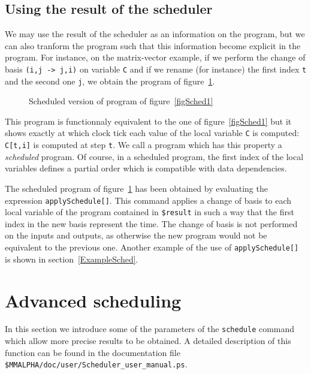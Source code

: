 \subsection{Using the result of the scheduler}

We may use the result of the scheduler as an information on the program, 
but we can also tranform the {\aalpha} program such that this information
become explicit in the program.  For instance, on the matrix-vector example, 
if we perform the change of basis
\texttt{(i,j -> j,i)} on variable \texttt{C}
and if we rename (for instance) 
the first index \texttt{t} and the second one \texttt{j},
we obtain the program of figure~\ref{figSched3}.

\begin{figure}[htbp]

\caption{Scheduled version of  program of figure~\ref{figSched1}}
\label{figSched3}
\end{figure}

This program is functionnaly equivalent to the one of figure~\ref{figSched1}
but it shows exactly at which clock tick each  value of the local variable
\texttt{C} is computed: \texttt{C[t,i]} is computed at step \texttt{t}. We call
a program which has this property a  {\em
scheduled} {\aalpha} program.  Of course, in a scheduled {\aalpha}
program, the first index of the local variables defines a partial
order which is compatible with data dependencies.

The scheduled program of figure~\ref{figSched3} has been obtained by
evaluating the expression
\texttt{applySchedule[]}.  This command applies a
change of basis to each local variable of the program contained in
\texttt{\$result} in such a way that the first index in the new basis
represent the time. The change of basis is not performed on the inputs
and outputs, as otherwise the new program would not be equivalent to the
previous one. Another example of the use of \texttt{applySchedule[]}
is shown in section~\ref{ExampleSched}.

\section{Advanced scheduling}
In this section we introduce some of the parameters of the 
\texttt{schedule} command which allow more precise results to be
obtained.  A detailed description of this function can be found in
the documentation 
file \texttt{\$MMALPHA/doc/user/Scheduler\_user\_manual.ps}.

